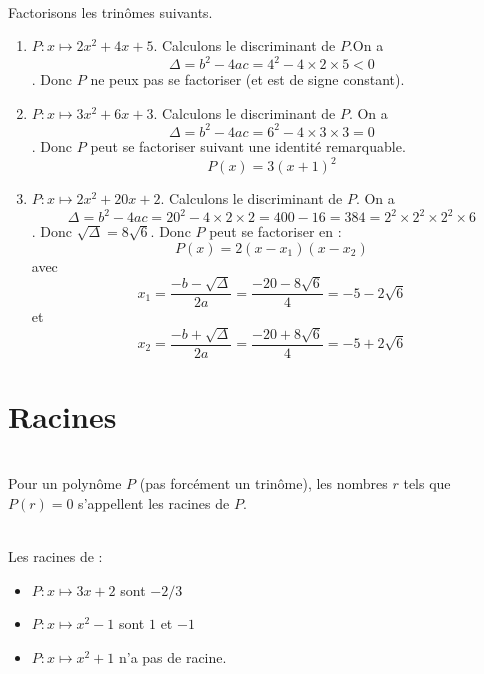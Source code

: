 \documentclass[12pt,fleqn]{report} %
\begin{document}
\begin{example}\text{ }\\
	Factorisons les trinômes suivants.
	\begin{enumerate}
		\item $P : x \mapsto 2 x^2 + 4x + 5$. 
		Calculons le discriminant de $P$.On a  \[\Delta = b^2 - 4ac = 4^2 - 4\times 2 \times 5 < 0\]. Donc $P$ ne peux pas se factoriser (et est de signe constant).
		
		\item $P : x \mapsto 3x^2 + 6x + 3$. Calculons le discriminant de $P$. On a \[\Delta = b^2 - 4ac = 6^2 - 4 \times 3 \times 3 = 0\]. Donc $P$ peut se factoriser suivant une identité remarquable. \[
		P(x) = 3\left(x + 1 \right)^2
		\]
		\item $P : x \mapsto 2x^2 + 20x + 2$. Calculons le discriminant de $P$. On a \[\Delta = b^2 - 4ac = 20^2 - 4 \times 2 \times 2 = 400 - 16 = 384 = 2^2 \times 2^2 \times 2 ^2 \times 6\]. Donc $\sqrt{\Delta}  = 8\sqrt{6}$. Donc $P$ peut se factoriser en :
		\[
		P(x) = 2(x - x_1)(x - x_2)
		\]
		avec 
		\[
		x_1 = \frac{-b - \sqrt{\Delta}}{2a} = \frac{-20 - 8\sqrt{6}}{4} = -5 - 2\sqrt{6}
		\] et 
		\[
		x_2 = \frac{-b +\sqrt{\Delta}}{2a} = \frac{-20 + 8\sqrt{6}}{4} = -5 + 2\sqrt{6}
		\]
	\end{enumerate}
\end{example}
\pagebreak
\section{Racines}
\begin{definition}\text{ }\\
	Pour un polynôme $P$ (pas forcément un trinôme), les nombres $r$ tels que $P(r) = 0$ s'appellent les racines de $P$.
\end{definition}

\begin{example}\text{ }\\
	Les racines de :
	\begin{itemize}
		\item $P : x \mapsto 3x + 2$ sont $-2/3$
		\item $P : x \mapsto x^2 - 1$ sont $1$ et $-1$
		\item $P : x \mapsto x^2 + 1$ n'a pas de racine.
	\end{itemize}
\end{example}
\end{document}
